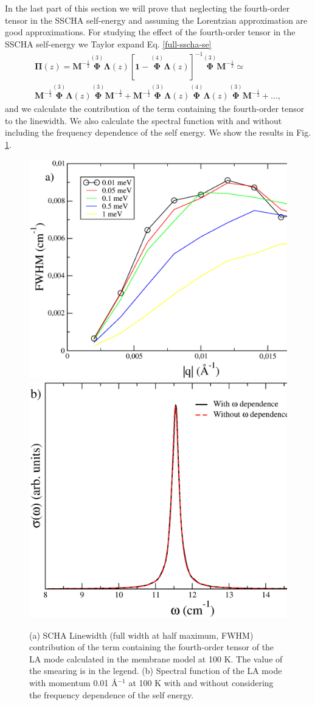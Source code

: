 In the last part of this section we will prove that neglecting the fourth-order tensor in the SSCHA self-energy and 
assuming the Lorentzian approximation are good approximations. For studying the effect of the fourth-order tensor 
in the SSCHA self-energy we Taylor expand Eq. \ref{full-sscha-se}
\begin{multline}
 \boldsymbol{\Pi}(z)=\mathbf{M}^{-\frac{1}{2}}\overset{(3)}{\mathbf{\Phi}}\mathbf{\Lambda}(z)[\mathbf{1}-\overset{(4)}{\mathbf{\Phi}}\mathbf{\Lambda}(z)]^{-1}
 \overset{(3)}{\mathbf{\Phi}}\mathbf{M}^{-\frac{1}{2}}\simeq\\\mathbf{M}^{-\frac{1}{2}}\overset{(3)}{\mathbf{\Phi}}\mathbf{\Lambda}(z)\overset{(3)}{\mathbf{\Phi}}\mathbf{M}^{-\frac{1}{2}}+\mathbf{M}^{-\frac{1}{2}}\overset{(3)}{\mathbf{\Phi}}\mathbf{\Lambda}(z)\overset{(4)}{\mathbf{\Phi}}\mathbf{\Lambda}(z)\overset{(3)}{\mathbf{\Phi}}\mathbf{M}^{-\frac{1}{2}}+\dots,
\end{multline}
and we calculate the contribution of the term containing the fourth-order tensor to the linewidth. We also calculate 
the spectral function with and without including the frequency dependence of the self energy. We show the results in 
Fig. \ref{lw_membrane}.
\begin{figure}[ht]
\includegraphics[width=0.49\linewidth]{Figures/v4-membrane.eps}
\includegraphics[width=0.45\linewidth]{Figures/spf-lorentzian-membrane.eps}
	\caption[Fourth-order term contribution to the linewidth in graphene. Spectral function within the 
	Lorentzian and non-Lorentzian approximations]{(a) SCHA Linewidth (full width at half maximum, FWHM) 
	contribution of the term containing the fourth-order tensor of the LA mode calculated in the membrane model 
	at 100 K. The value of the smearing is in the legend. (b) Spectral function of the LA mode with momentum 0.01 
	\AA$^{-1}$ at 100 K with and without considering the frequency dependence of the self energy.}
\label{lw_membrane}
\end{figure}
